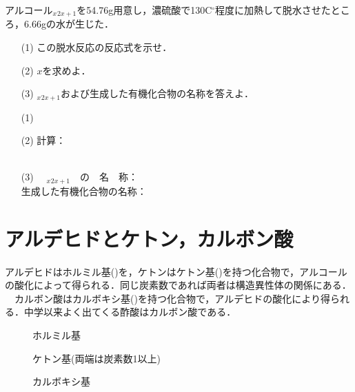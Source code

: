 \documentclass[a4paper,12pt]{ltjsreport}
\begin{document}
        \newpage
        \begin{que}
        アルコール$_{x}$$_{2x+1}$を54.76g用意し，濃硫酸で130C$^\circ$程度に加熱して脱水させたところ，$6.66$gの水が生じた．
      \begin{itemize}
        \item [(1)]この脱水反応の反応式を示せ．
        \item [(2)]$x$を求めよ．
        \item [(3)]$_{x}$$_{2x+1}$および生成した有機化合物の名称を答えよ．
      \end{itemize}
        \end{que}
        \ans
        \begin{itemize}
            \item [(1)]　\\[15pt]
            \item [(2)]計算：\\[100pt]
            \\
            \item [(3)]　$_{x}$$_{2x+1}$　の　名　称：\\[35pt]
        生成した有機化合物の名称：
        \end{itemize}
        \newpage
        \section{アルデヒドとケトン，カルボン酸}
        アルデヒドはホルミル基()を，ケトンはケトン基()を持つ化合物で，アルコールの酸化によって得られる．同じ炭素数であれば両者は構造異性体の関係にある．\\
　カルボン酸はカルボキシ基()を持つ化合物で，アルデヒドの酸化により得られる．中学以来よく出てくる酢酸はカルボン酸である．\\
\begin{minipage}{0.25\linewidth}
\begin{figure}[H]
\centering
{}
\caption{ホルミル基}
\end{figure}
\end{minipage}
\begin{minipage}{0.5\linewidth}
\begin{figure}[H]
\centering
{}
\caption{ケトン基(両端は炭素数1以上)}
\end{figure}
\end{minipage}
\begin{minipage}{0.25\linewidth}
\begin{figure}[H]
    \centering
\caption{カルボキシ基} 
\end{figure}
\end{minipage}
\end{document}
